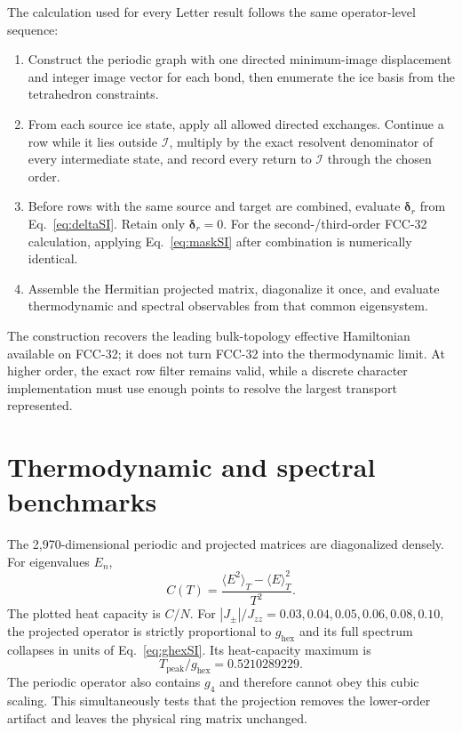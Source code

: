 \documentclass[aps,prl,onecolumn,amsmath,amssymb,superscriptaddress]{revtex4-2}
\newcommand{\Jzz}{J_{zz}}
\newcommand{\Jpm}{J_{\pm}}
\newcommand{\ghex}{g_{\mathrm{hex}}}
\newcommand{\gfour}{g_4}
\newcommand{\bdelta}{\bm\delta}
\newcommand{\ice}{\mathcal I}
\begin{document}
The calculation used for every Letter result follows the same operator-level
sequence:
\begin{enumerate}
\item Construct the periodic graph with one directed minimum-image
displacement and integer image vector for each bond, then enumerate the ice
basis from the tetrahedron constraints.
\item From each source ice state, apply all allowed directed exchanges.
Continue a row while it lies outside $\ice$, multiply by the exact resolvent
denominator of every intermediate state, and record every return to $\ice$
through the chosen order.
\item Before rows with the same source and target are combined, evaluate
$\bdelta_r$ from Eq.~\eqref{eq:deltaSI}.  Retain only $\bdelta_r=0$.  For the
second-/third-order FCC-32 calculation, applying Eq.~\eqref{eq:maskSI} after
combination is numerically identical.
\item Assemble the Hermitian projected matrix, diagonalize it once, and
evaluate thermodynamic and spectral observables from that common
eigensystem.
\end{enumerate}
The construction recovers the leading bulk-topology effective Hamiltonian
available on FCC-32; it does not turn FCC-32 into the thermodynamic limit.
At higher order, the exact row filter remains valid, while a discrete
character implementation must use enough points to resolve the largest
transport represented.

\section{Thermodynamic and spectral benchmarks}
\label{sec:benchmarks}

The 2,970-dimensional periodic and projected matrices are diagonalized
densely. For eigenvalues $E_n$,
\begin{equation}
 C(T)=\frac{\langle E^2\rangle_T-\langle E\rangle_T^2}{T^2}.
\end{equation}
The plotted heat capacity is $C/N$. For
$|\Jpm|/\Jzz=0.03,0.04,0.05,0.06,0.08,0.10$, the projected operator is
strictly proportional to $\ghex$ and its full spectrum collapses in units of
Eq.~\eqref{eq:ghexSI}. Its heat-capacity maximum is
\begin{equation}
 T_{\mathrm{peak}}/\ghex=0.5210289229.
\label{eq:alpha32}
\end{equation}
The periodic operator also contains $\gfour$ and therefore cannot obey this
cubic scaling. This simultaneously tests that the projection removes the
lower-order artifact and leaves the physical ring matrix unchanged.
\end{document}
